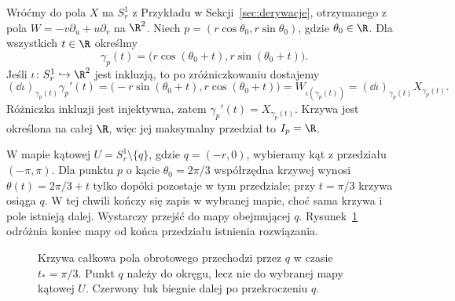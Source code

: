 \begin{przyklad}
Wróćmy do pola $X$ na $S_r^1$ z Przykładu w
Sekcji~\ref{sec:derywacje}, otrzymanego z pola
$W=-v\partial_u+u\partial_v$ na $\R^2$.
Niech $p=(r\cos\theta_0,r\sin\theta_0)$, gdzie $\theta_0\in\R$.
Dla wszystkich $t\in\R$ określmy
\[
\gamma_p(t)=\bigl(r\cos(\theta_0+t),
                    r\sin(\theta_0+t)\bigr).
\]
Jeśli $\iota\colon S_r^1\hookrightarrow\R^2$ jest inkluzją,
to po zróżniczkowaniu dostajemy
\[
(\dd\iota)_{\gamma_p(t)}\gamma_p'(t)
=\bigl(-r\sin(\theta_0+t),r\cos(\theta_0+t)\bigr)
=W_{\iota(\gamma_p(t))}
=(\dd\iota)_{\gamma_p(t)}X_{\gamma_p(t)}.
\]
Różniczka inkluzji jest injektywna, zatem
$\gamma_p'(t)=X_{\gamma_p(t)}$.
Krzywa jest określona na całej $\R$, więc jej maksymalny
przedział to $I_p=\R$.

W mapie kątowej $U=S_r^1\setminus\{q\}$, gdzie $q=(-r,0)$,
wybieramy kąt z przedziału $(-\pi,\pi)$. Dla punktu
$p$ o kącie $\theta_0=2\pi/3$ współrzędna krzywej wynosi
$\theta(t)=2\pi/3+t$ tylko dopóki pozostaje w tym przedziale;
przy $t=\pi/3$ krzywa osiąga $q$. W tej chwili kończy się zapis
w wybranej mapie, choć sama krzywa i pole istnieją dalej.
Wystarczy przejść do mapy obejmującej $q$.
Rysunek~\ref{fig:krzywa-przez-granice-mapy} odróżnia koniec mapy
od końca przedziału istnienia rozwiązania.
\end{przyklad}

\begin{figure}[!htbp]
\centering
{}
\caption{Krzywa całkowa pola obrotowego przechodzi przez $q$ w czasie
$t_*=\pi/3$. Punkt $q$ należy do okręgu, lecz nie do wybranej mapy
kątowej $U$. Czerwony łuk biegnie dalej po przekroczeniu $q$.}
\label{fig:krzywa-przez-granice-mapy}
\end{figure}

